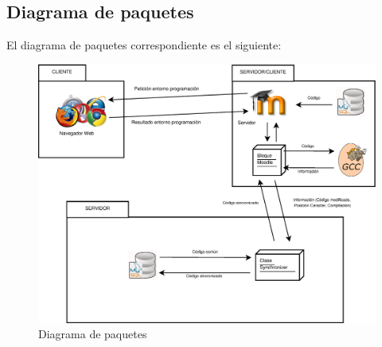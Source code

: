 \newpage
\subsection{Diagrama de paquetes}

El diagrama de paquetes correspondiente es el siguiente:

\begin{figure}[h]
	\centering
	\includegraphics[width=\textwidth]{./img/diagramapaquetes.eps}
	\caption{Diagrama de paquetes}
\end{figure}


















































